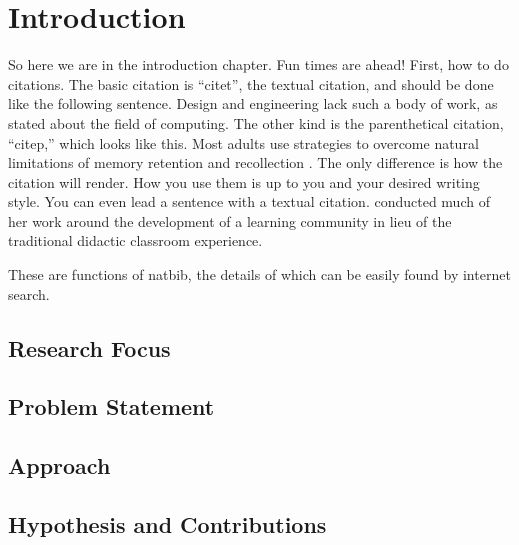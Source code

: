 \chapter{Introduction}

So here we are in the introduction chapter. Fun times are ahead! First, how to do citations. The basic citation is ``citet'', the textual citation, and should be done like the following sentence. Design and engineering lack such a body of work, as \citet[p. 35]{csed-guzdial} stated about the field of computing. The other kind is the parenthetical citation, ``citep,'' which looks like this. Most adults use strategies to overcome natural limitations of memory retention and recollection \citep{brown-1992}. The only difference is how the citation will render. How you use them is up to you and your desired writing style. You can even lead a sentence with a textual citation. \citet{brown-1992} conducted much of her work around the development of a learning community in lieu of the traditional didactic classroom experience. 

These are functions of natbib, the details of which can be easily found by internet search.

\section{Research Focus}

 
\section{Problem Statement}


\section{Approach}


\section{Hypothesis and Contributions}


